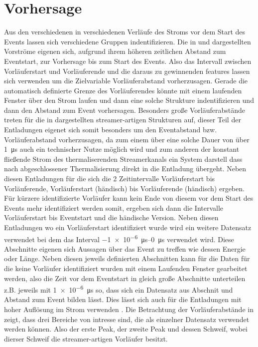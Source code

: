 \chapter{Vorhersage}
\label{chap:prediction}

Aus den verschiedenen in  verschiedenen Verläufe des Stroms vor dem Start des Events lassen sich verschiedene Gruppen indentifizieren. Die in  und  dargestellten Vorströme eigenen sich, aufgrund ihrem höheren zeitlichen Abstand zum Eventstart, zur Vorhersage bis zum Start des Events. Also das Intervall zwischen Vorläuferstart und Vorläuferende und die daraus zu gewinnenden features lassen sich verwenden um die Zielvariable Vorläuferabstand vorherzusagen. Gerade die automatisch definierte Grenze des Vorläuferendes könnte mit einem laufenden Fenster über den Strom laufen und dann eine solche Strukture indentifizieren und dann den Abstand zum Event vorhersagen. Besonders große Vorläuferabstände treten für die in  dargestellten streamer-artigen Strukturen auf, dieser Teil der Entladungen eigenet sich somit besonders um den Eventabstand bzw. Vorläuferabstand vorherzusagen, da zum einem über eine solche Dauer von über \SI{1}{\micro\second} auch ein technischer Nutze möglich wird und zum anderen der konstant fließende Strom des thermaliserenden Streamerkanals ein System darstell dass nach abgeschlossener Thermalisierung direkt in die Entladung übergeht. Neben diesen Entladungen für die sich die 2 Zeitintervalle Vorläuferstart bis Vorläuferende, Vorläuferstart (händisch) bis Vorläuferende (händisch) ergeben. Für kürzere identifizierte Vorläufer kann kein Ende von diesem vor dem Start des Events mehr identifiziert werden somit, ergeben sich dann die Intervalle Vorläuferstart bis Eventstart und die händische Version. Neben diesen Entladungen wo ein Vorläuferstart identifiziert wurde wird ein weitere Datensatz verwendet bei dem das Interval \SIrange{-1e-6}{0}{\micro\second} verwendet wird. Diese Abschnitte eigenen sich Aussagen über das Event zu treffen wie dessen Energie oder Länge. Neben diesen jeweils definierten Abschnitten kann für die Daten für die keine Vorläufer identifiziert wurden mit einem Laufenden Fenster gearbeitet werden, also die Zeit vor dem Eventstart in gleich große Abschnitte unterteilen z.B. jeweils mit \SI{1e-6}{\micro\second} so, dass sich ein Datensatz aus Abschnit und Abstand zum Event bilden lässt. Dies lässt sich auch für die Entladungen mit hoher Auflösung im Strom verwenden . Die Betrachtung der Vorläuferabstände in  zeigt, dass drei Bereiche von intresse sind, die als einzelner Datensatz verwendet werden können. Also der erste Peak, der zweite Peak und dessen Schweif, wobei dierser Schweif die streamer-artigen Vorläufer besitzt. 


